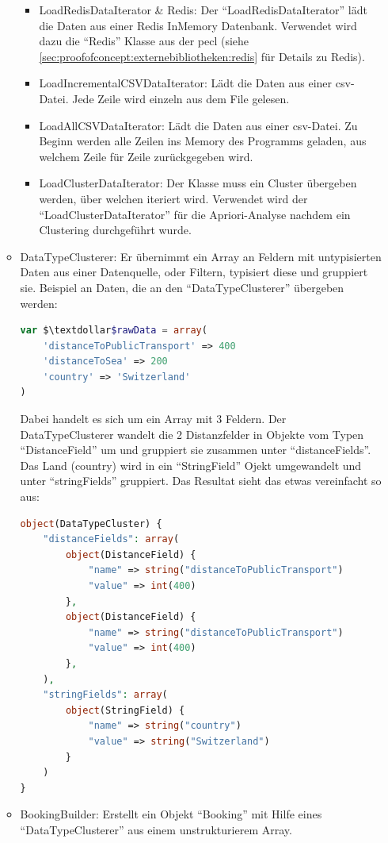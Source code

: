 \begin{itemize}
\begin{itemize}
				\begin{itemize}
					\item LoadRedisDataIterator \& Redis: Der "`LoadRedisDataIterator"' lädt die Daten aus einer Redis InMemory Datenbank. Verwendet wird dazu die "`Redis"' Klasse aus der \gls{pecl} (siehe \cref{sec:proofofconcept:externebibliotheken:redis}  für Details zu Redis).
					\item LoadIncrementalCSVDataIterator: Lädt die Daten aus einer \gls{csv}-Datei. Jede Zeile wird einzeln aus dem File gelesen.
					\item LoadAllCSVDataIterator: Lädt die Daten aus einer \gls{csv}-Datei. Zu Beginn werden alle Zeilen ins Memory des Programms geladen, aus welchem Zeile für Zeile zurückgegeben wird.
					\item LoadClusterDataIterator: Der Klasse muss ein Cluster übergeben werden, über welchen iteriert wird. Verwendet wird der "`LoadClusterDataIterator"' für die Apriori-Analyse nachdem ein Clustering durchgeführt wurde.
				\end{itemize}
			\item DataTypeClusterer: Er übernimmt ein Array an Feldern mit untypisierten Daten aus einer Datenquelle, oder Filtern, typisiert diese und gruppiert sie. Beispiel an Daten, die an den "`DataTypeClusterer"' übergeben werden:
			\begin{lstlisting}[language=php]
var $\textdollar$rawData = array(
	'distanceToPublicTransport' => 400
	'distanceToSea' => 200
	'country' => 'Switzerland'
)
			\end{lstlisting}
			Dabei handelt es sich um ein Array mit 3 Feldern. Der DataTypeClusterer wandelt die 2 Distanzfelder in Objekte vom Typen "`DistanceField"' um und gruppiert sie zusammen unter "`distanceFields"'. Das Land (country) wird in ein "`StringField"' Ojekt umgewandelt und unter "`stringFields"' gruppiert. Das Resultat sieht das etwas vereinfacht so aus:
			\begin{lstlisting}[language=php]
object(DataTypeCluster) {
	"distanceFields": array(
		object(DistanceField) {
			"name" => string("distanceToPublicTransport")
			"value" => int(400)
		},
		object(DistanceField) {
			"name" => string("distanceToPublicTransport")
			"value" => int(400)
		},
	),
	"stringFields": array(
		object(StringField) {
			"name" => string("country")
			"value" => string("Switzerland")
		}
	)
}
			\end{lstlisting}
			\item BookingBuilder: Erstellt ein Objekt "`Booking"' mit Hilfe eines "`DataTypeClusterer"' aus einem unstrukturierem Array.
		\end{itemize}
\end{itemize}

